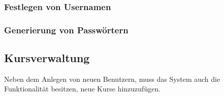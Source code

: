 	

\subsubsection{Festlegen von Usernamen}

\subsubsection{Generierung von Passwörtern}


\subsection{Kursverwaltung}

Neben dem Anlegen von neuen Benutzern, muss das System auch die Funktionalität besitzen, neue Kurse hinzuzufügen.

